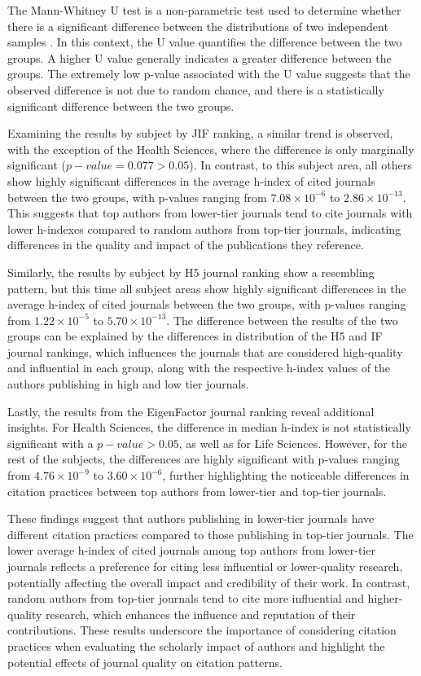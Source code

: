 The Mann-Whitney U test is a non-parametric test used to determine whether
there is a significant difference between the distributions of two independent
samples \cite{mann1947test}. In this context, the U value quantifies the
difference between the two groups. A higher U value generally indicates a
greater difference between the groups. The extremely low p-value associated
with the U value suggests that the observed difference is not due to random
chance, and there is a statistically significant difference between the two
groups.

Examining the results by subject by JIF ranking, a similar trend is observed,
with the exception of the Health Sciences, where the difference is only
marginally significant ($p-value = 0.077 > 0.05$). In contrast, to this subject
area, all others show highly significant differences in the average h-index of
cited journals between the two groups, with p-values ranging from $7.08 \times
    10^{-6}$ to $2.86 \times 10^{-13}$. This suggests that top authors from
lower-tier journals tend to cite journals with lower h-indexes compared to
random authors from top-tier journals, indicating differences in the quality
and impact of the publications they reference.

Similarly, the results by subject by H5 journal ranking show a resembling
pattern, but this time all subject areas show highly significant differences in
the average h-index of cited journals between the two groups, with p-values
ranging from $1.22 \times 10^{-5}$ to $5.70 \times 10^{-13}$. The difference
between the results of the two groups can be explained by the differences in
distribution of the H5 and IF journal rankings, which influences the journals
that are considered high-quality and influential in each group, along with the
respective h-index values of the authors publishing in high and low tier
journals.

Lastly, the results from the EigenFactor journal ranking reveal additional
insights. For Health Sciences, the difference in median h-index is not
statistically significant with a $p-value > 0.05$, as well as for Life
Sciences. However, for the rest of the subjects, the differences are highly
significant with p-values ranging from $4.76 \times 10^{-9}$ to $3.60 \times
    10^{-6}$, further highlighting the noticeable differences in citation practices
between top authors from lower-tier and top-tier journals.

These findings suggest that authors publishing in lower-tier journals have
different citation practices compared to those publishing in top-tier journals.
The lower average h-index of cited journals among top authors from lower-tier
journals reflects a preference for citing less influential or lower-quality
research, potentially affecting the overall impact and credibility of their
work. In contrast, random authors from top-tier journals tend to cite more
influential and higher-quality research, which enhances the influence and
reputation of their contributions. These results underscore the importance of
considering citation practices when evaluating the scholarly impact of authors
and highlight the potential effects of journal quality on citation patterns.

